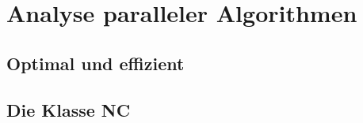 \section{Analyse paralleler Algorithmen}

\subsection{Optimal und effizient}


\subsection{Die Klasse NC}
